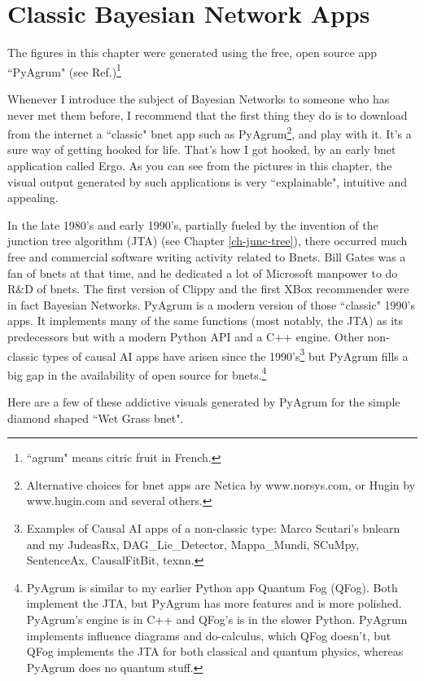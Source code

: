 \chapter{Classic Bayesian Network Apps}
\label{ch-bnet-apps}

The figures in this chapter were generated using
the free, open source app ``PyAgrum" (see Ref.\cite{pyagrum})\footnote{``agrum" means citric fruit in French. }


Whenever I introduce the subject of Bayesian Networks
to someone who has never met them before, I recommend that the first thing they do is to
download from the internet a ``classic" bnet app  such as PyAgrum\footnote{Alternative choices for bnet apps are Netica by www.norsys.com, or Hugin by www.hugin.com and several others.}, and play with it. It's a sure way of getting hooked
for life. That's how I got hooked, by an early bnet application called Ergo. As you can see from the pictures in this chapter,
the visual output generated by such applications is very ``explainable", intuitive and appealing.

  
In the late 1980's and early 1990's, partially fueled by the invention of
the junction tree algorithm (JTA) (see Chapter \ref{ch-junc-tree}), there occurred much free and commercial software writing activity related to Bnets. Bill Gates was a fan of bnets at that time, and he dedicated a lot of Microsoft manpower to do R\&D of bnets. The first version of Clippy and the first XBox recommender were in fact Bayesian Networks. PyAgrum is a modern version of those ``classic" 1990's apps. It implements many of the same functions (most notably, the JTA) as its predecessors but with a modern Python API and a C++ engine. Other non-classic types of causal AI apps have arisen since the 1990's\footnote{Examples of Causal AI apps of a non-classic type:  Marco Scutari's bnlearn and my JudeasRx, DAG\_Lie\_Detector, Mappa\_Mundi, SCuMpy, SentenceAx, CausalFitBit, texnn.} but PyAgrum fills a big gap in the availability of open source for bnets.\footnote{PyAgrum is similar to my earlier Python app Quantum Fog (QFog). Both implement the JTA, but PyAgrum  has more features and is more polished.
PyAgrum's engine is in C++ and QFog's is in the slower Python.  PyAgrum implements influence diagrams
and do-calculus, which QFog doesn't, but QFog implements the JTA for both classical and quantum physics, whereas PyAgrum does no quantum stuff.}

Here are a few of these addictive visuals generated by PyAgrum
for the simple diamond shaped  ``Wet Grass bnet".

